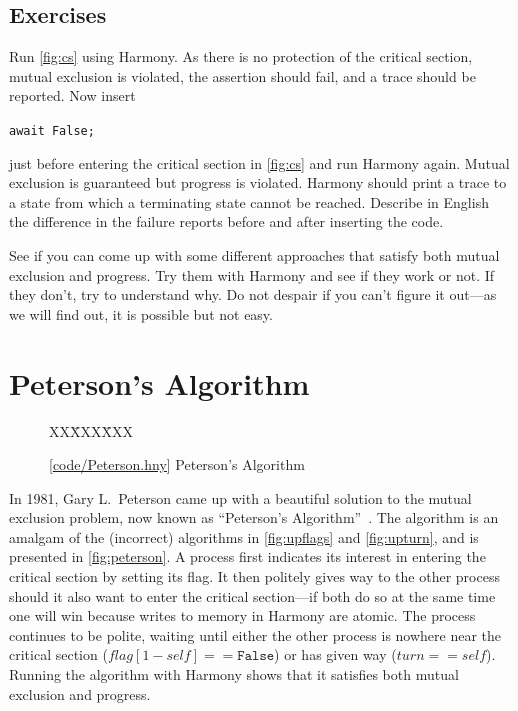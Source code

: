 \documentclass{report}
\newcommand{\harmonysource}[1]{
\begin{tabbing}
XX\=XXX\=XXX\kill
    
\end{tabbing}
}
\newcommand{\harmonylink}[1]{%
[\href{https://www.cs.cornell.edu/home/rvr/harmony/#1}{\underline{#1}}]%
}
\newenvironment{code}{
\tcolorbox
}{
\endtcolorbox
}
\begin{document}
\section*{Exercises}
\begin{problems}
\item Run \autoref{fig:cs} using Harmony.  As there is no protection of the critical
section, mutual exclusion is violated,
the assertion should fail, and a trace should be reported.
Now insert
\begin{code}
\texttt{await False;}
\end{code}
just before entering the critical section
in \autoref{fig:cs} and run Harmony again.
Mutual exclusion is guaranteed but progress is violated.
Harmony should print a trace
to a state from which a terminating state cannot be reached.
Describe in English the difference in the failure reports before
and after inserting the code.
\item See if you can come up with some different approaches that satisfy both
mutual exclusion and progress.  Try them with Harmony and see if they work or not.
If they don't, try to understand why.
Do not despair if you can't figure it out---as
we will find out, it is possible but not easy.
\end{problems}

\chapter{Peterson's Algorithm}
\label{ch:peterson}
%

\begin{figure}
\begin{code}
\harmonysource{Peterson}
\end{code}
\caption{\harmonylink{code/Peterson.hny} Peterson's Algorithm}
\label{fig:peterson}
\end{figure}

In 1981, Gary L.~Peterson came up with a beautiful solution to the mutual exclusion
problem, now known as ``Peterson's Algorithm''~\cite{Peterson81}.
The algorithm is an amalgam of the (incorrect) algorithms in
\autoref{fig:upflags} and \autoref{fig:upturn}, and is presented
in \autoref{fig:peterson}.
A process first indicates its interest in entering the critical section
by setting its flag.
It then politely gives way to the other process should it also want to
enter the critical section---if both do so at the same time one will
win because writes to memory in Harmony are atomic.
The process continues to be polite, waiting
until either the other process is nowhere near the critical section
($\mathit{flag}[1 - \mathit{self}] == \mathtt{False}$) or has given way
($\mathit{turn} == \mathit{self}$).
Running the algorithm with Harmony shows that it satisfies both mutual
exclusion and progress.
\end{document}
